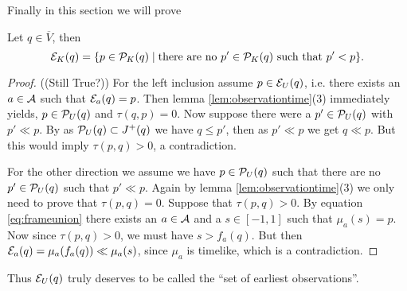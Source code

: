 Finally in this section we will prove
\begin{proposition}\label{prop:seocharact}
Let $q\in \overline{V}$, then 
\begin{equation*}
    \mc{E}_K(q) = \{ p \in \P_K(q) \mid \text{there are no $p'\in \P_K(q)$ such that $p' < p$} \}.
\end{equation*}
\end{proposition}
\begin{proof}
((Still True?))
For the left inclusion assume $p\in \mc{E}_U(q)$, i.e. there exists an $a\in \ca$ such that $\mc{E}_a(q)=p$. Then lemma \ref{lem:observationtime}(3) immediately yields, $p\in \P_U(q)$ and  $\tau(q,p)=0$. Now suppose there were a $p'\in \P_U(q)$ with $p'\ll p$. By as $\P_U(q)\subset J^+(q)$ we have $q\leq p'$, then as $p'\ll p$ we get $q\ll p$. But this would imply $\tau(p,q)>0$, a contradiction.

For the other direction we assume we have $p \in \P_U(q)$ such that there are no $p'\in\P_U(q)$ such that $p'\ll p$. Again by lemma \ref{lem:observationtime}(3) we only need to prove that $\tau(p,q)=0$. Suppose that $\tau(p,q)>0$. By equation \ref{eq:frameunion} there exists an $a\in \ca$ and a $s\in [-1,1]$ such that $\mu_a(s) = p$. Now since $\tau(p,q)>0$, we must have $s > f_a(q)$. But then $\mc{E}_a(q) = \mu_a(f_a(q)) \ll  \mu_a(s)$, since $\mu_a$ is timelike, which is a contradiction.
\end{proof}
Thus $\mc{E}_U(q)$ truly deserves to be called the \enquote{set of earliest observations}.


